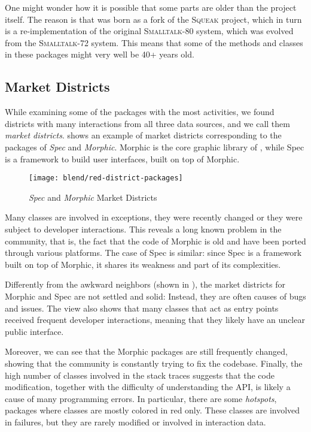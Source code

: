 One might wonder how it is possible that some parts are older than the \pha project itself. The reason is that \pha was born as a fork of the \textsc{Squeak} project, which in turn is a re-implementation of the original \textsc{Smalltalk-80} system, which was evolved from the \textsc{Smalltalk-72} system. This means that some of the methods and classes in these packages might very well be 40+ years old.

\subsection{Market Districts}

While examining some of the packages with the most activities, we found districts with many interactions from all three data sources, and we call them \emph{market districts}.  shows an example of market districts corresponding to the packages of \textit{Spec} and \textit{Morphic}. Morphic is the core graphic library of \pha, while Spec is a framework to build user interfaces, built on top of Morphic. 
	
\begin{figure}[ht]
\centering
\texttt{[image: blend/red-district-packages]}
\caption{\textit{Spec} and \textit{Morphic} Market Districts}
\label{fig:market-districts}
\end{figure}

Many classes are involved in exceptions, they were recently changed or they were subject to developer interactions. This reveals a long known problem in the community, that is, the fact that the code of Morphic is old and have been ported through various platforms.  The case of Spec is similar: since Spec is a framework built on top of Morphic, it shares its weakness and part of its complexities.

Differently from the awkward neighbors (shown in ), the market districts for Morphic and Spec are not settled and solid: Instead, they are often causes of bugs and issues. The view also shows that many classes that act as entry points received frequent developer interactions, meaning that they likely have an unclear public interface. 

Moreover, we can see that the Morphic packages are still frequently changed, showing that the community is constantly trying to fix the codebase. Finally, the high number of classes involved in the stack traces suggests that the code modification, together with the difficulty of understanding the API, is likely a cause of many programming errors. In particular, there are some \emph{hotspots}, \ie packages where classes are mostly colored in red only. These classes are involved in failures, but they are rarely modified or involved in interaction data. 

